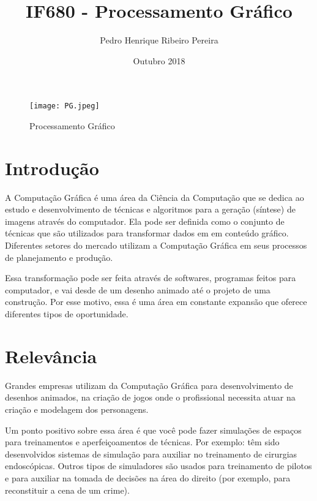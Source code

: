 \documentclass[10pt]{article}
\title{IF680 - Processamento Gráfico}
\author{Pedro Henrique Ribeiro Pereira}
\date{Outubro 2018}
\begin{document}
\maketitle

\begin{figure}[h!]
\centering
\texttt{[image: PG.jpeg]}
\caption{Processamento Gráfico}
\end{figure}

\section{Introdução}
A Computação Gráfica é uma área da Ciência da Computação que se dedica
ao estudo e desenvolvimento de técnicas e algoritmos para a geração (síntese) de imagens
através do computador. Ela pode ser definida como o conjunto de técnicas que são utilizados para transformar dados em em conteúdo gráfico. Diferentes setores do mercado utilizam a Computação Gráfica em seus processos de planejamento e produção. 

Essa transformação pode ser feita através de softwares, programas feitos para computador, e vai desde de um desenho animado até o projeto de uma construção. Por esse motivo, essa é uma área em constante expansão que oferece diferentes tipos de oportunidade.
\citep{PAG}

\section{Relevância}
Grandes empresas utilizam da Computação Gráfica para desenvolvimento de desenhos animados, na criação de jogos onde o profissional necessita atuar na criação e modelagem dos personagens.

Um ponto positivo sobre essa área é que você pode fazer simulações de espaços para treinamentos e aperfeiçoamentos de técnicas. Por exemplo: têm sido desenvolvidos sistemas de simulação para auxiliar no
treinamento de cirurgias endoscópicas. Outros tipos de simuladores são usados para treinamento
de pilotos e para auxiliar na tomada de decisões na área do direito (por exemplo, para
reconstituir a cena de um crime).

\citep{PUCRS}
\end{document}
